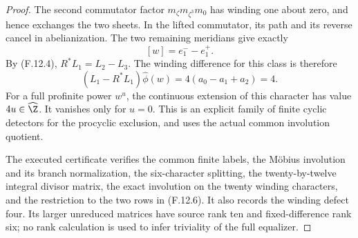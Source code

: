 \begin{proof}
The second commutator factor
$m_\zeta m_{\zeta^3}m_0$ has winding one
about zero, and hence exchanges the
two sheets.  In the lifted commutator,
its path and its reverse cancel in
abelianization.  The two remaining
meridians give exactly
\[
                         [w]=e_1^- -e_1^+ .
                                                               \tag{F.12.19}
\]
By (F.12.4), $R^*L_1=L_2-L_3$.
The winding difference for this class
is therefore
\[
       (L_1-R^*L_1)\widehat\phi(w)
               =4(a_0-a_1+a_2)=4.
                                                               \tag{F.12.20}
\]
For a full profinite power $w^u$, the
continuous extension of this character
has value $4u\in\widehat\Z$.
It vanishes only for $u=0$.
This is an explicit family of finite
cyclic detectors for the procyclic
exclusion, and uses the actual common
involution quotient.

The executed certificate
verifies the common finite labels, the
M\"obius involution and its branch
normalization, the six-character splitting,
the twenty-by-twelve integral divisor
matrix, the exact involution on the
twenty winding characters, and the
restriction to the two rows in (F.12.6).
It also records the winding defect four.
Its larger unreduced matrices have source
rank ten and fixed-difference rank six;
no rank calculation is used to infer
triviality of the full equalizer.
\end{proof}
